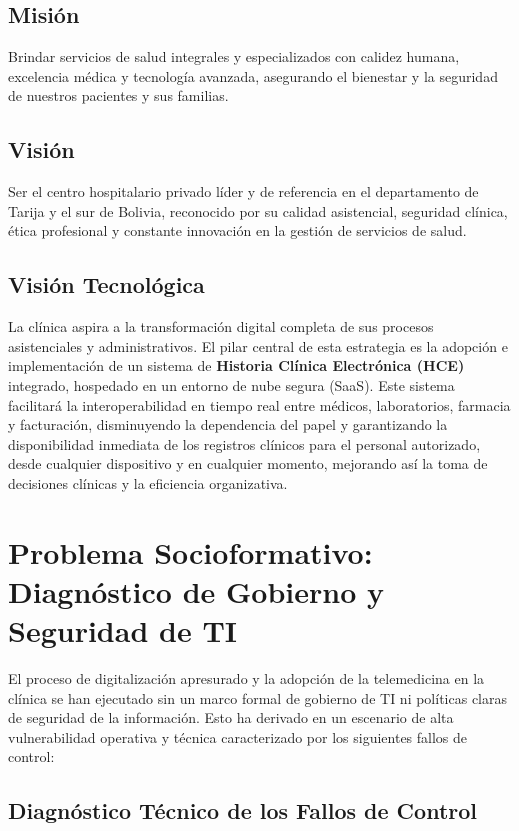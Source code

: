 \subsection{Misión}
Brindar servicios de salud integrales y especializados con calidez humana, excelencia médica y tecnología avanzada, asegurando el bienestar y la seguridad de nuestros pacientes y sus familias.

\subsection{Visión}
Ser el centro hospitalario privado líder y de referencia en el departamento de Tarija y el sur de Bolivia, reconocido por su calidad asistencial, seguridad clínica, ética profesional y constante innovación en la gestión de servicios de salud.

\subsection{Visión Tecnológica}
La clínica aspira a la transformación digital completa de sus procesos asistenciales y administrativos. El pilar central de esta estrategia es la adopción e implementación de un sistema de \textbf{Historia Clínica Electrónica (HCE)} integrado, hospedado en un entorno de nube segura (SaaS). Este sistema facilitará la interoperabilidad en tiempo real entre médicos, laboratorios, farmacia y facturación, disminuyendo la dependencia del papel y garantizando la disponibilidad inmediata de los registros clínicos para el personal autorizado, desde cualquier dispositivo y en cualquier momento, mejorando así la toma de decisiones clínicas y la eficiencia organizativa.

\section{Problema Socioformativo: Diagnóstico de Gobierno y Seguridad de TI}
El proceso de digitalización apresurado y la adopción de la telemedicina en la clínica se han ejecutado sin un marco formal de gobierno de TI ni políticas claras de seguridad de la información. Esto ha derivado en un escenario de alta vulnerabilidad operativa y técnica caracterizado por los siguientes fallos de control:

\subsection{Diagnóstico Técnico de los Fallos de Control}

